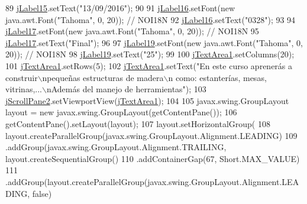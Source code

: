 \begin{DoxyCode}
89         \mbox{\hyperlink{classsoftware_1_1validornotvalid_aa1a81f594817fe87cc5fbbd85d33aa8a}{jLabel15}}.setText(\textcolor{stringliteral}{"13/09/2016"});
90 
91         \mbox{\hyperlink{classsoftware_1_1validornotvalid_a071acd2388aa23129a2da2e239c494d8}{jLabel16}}.setFont(\textcolor{keyword}{new} java.awt.Font(\textcolor{stringliteral}{"Tahoma"}, 0, 20)); \textcolor{comment}{// NOI18N}
92         \mbox{\hyperlink{classsoftware_1_1validornotvalid_a071acd2388aa23129a2da2e239c494d8}{jLabel16}}.setText(\textcolor{stringliteral}{"0328"});
93 
94         \mbox{\hyperlink{classsoftware_1_1validornotvalid_a5db46900582e8dd06da0cae9038921c9}{jLabel17}}.setFont(\textcolor{keyword}{new} java.awt.Font(\textcolor{stringliteral}{"Tahoma"}, 0, 20)); \textcolor{comment}{// NOI18N}
95         \mbox{\hyperlink{classsoftware_1_1validornotvalid_a5db46900582e8dd06da0cae9038921c9}{jLabel17}}.setText(\textcolor{stringliteral}{"Final"});
96 
97         \mbox{\hyperlink{classsoftware_1_1validornotvalid_a744ece24d9517e67e29e9c200e76b055}{jLabel19}}.setFont(\textcolor{keyword}{new} java.awt.Font(\textcolor{stringliteral}{"Tahoma"}, 0, 20)); \textcolor{comment}{// NOI18N}
98         \mbox{\hyperlink{classsoftware_1_1validornotvalid_a744ece24d9517e67e29e9c200e76b055}{jLabel19}}.setText(\textcolor{stringliteral}{"25"});
99 
100         \mbox{\hyperlink{classsoftware_1_1validornotvalid_aadacd01c76d614784cee0866af75c36c}{jTextArea1}}.setColumns(20);
101         \mbox{\hyperlink{classsoftware_1_1validornotvalid_aadacd01c76d614784cee0866af75c36c}{jTextArea1}}.setRows(5);
102         \mbox{\hyperlink{classsoftware_1_1validornotvalid_aadacd01c76d614784cee0866af75c36c}{jTextArea1}}.setText(\textcolor{stringliteral}{"En este curso aprenerás a construir\(\backslash\)npequeñas estructuras de madera\(\backslash\)n
      como: estanterías, mesas, vitrinas,...\(\backslash\)nAdemás del manejo de herramientas"});
103         \mbox{\hyperlink{classsoftware_1_1validornotvalid_afbe433c154dcca4c8d5a9c0714485d8e}{jScrollPane2}}.setViewportView(\mbox{\hyperlink{classsoftware_1_1validornotvalid_aadacd01c76d614784cee0866af75c36c}{jTextArea1}});
104 
105         javax.swing.GroupLayout layout = \textcolor{keyword}{new} javax.swing.GroupLayout(getContentPane());
106         getContentPane().setLayout(layout);
107         layout.setHorizontalGroup(
108             layout.createParallelGroup(javax.swing.GroupLayout.Alignment.LEADING)
109             .addGroup(javax.swing.GroupLayout.Alignment.TRAILING, layout.createSequentialGroup()
110                 .addContainerGap(67, Short.MAX\_VALUE)
111                 .addGroup(layout.createParallelGroup(javax.swing.GroupLayout.Alignment.LEADING, \textcolor{keyword}{false})

\end{DoxyCode}
